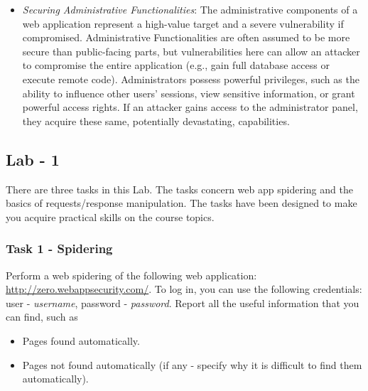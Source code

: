 \begin{itemize}
    \item \textit{Securing Administrative Functionalities}: The administrative components of a web application represent a high-value target and a severe vulnerability if compromised. Administrative Functionalities are often assumed to be more secure than public-facing parts, but vulnerabilities here can allow an attacker to compromise the entire application (e.g., gain full database access or execute remote code). Administrators possess powerful privileges, such as the ability to influence other users' sessions, view sensitive information, or grant powerful access rights. If an attacker gains access to the administrator panel, they acquire these same, potentially devastating, capabilities.
\end{itemize}

\subsection{Lab - 1}
There are three tasks in this Lab. The tasks concern web app spidering and the basics of requests/response manipulation. The tasks have been designed to make you acquire practical skills on the course topics.

\subsubsection{Task 1 - Spidering}
Perform a web spidering of the following web application: \url{http://zero.webappsecurity.com/}. To log in, you can use the following credentials: user - \emph{username}, password - \emph{password}. Report all the useful information that you can find, such as

\begin{itemize}
    \item Pages found automatically.
    \item Pages not found automatically (if any - specify why it is difficult to find them automatically).
\end{itemize}


